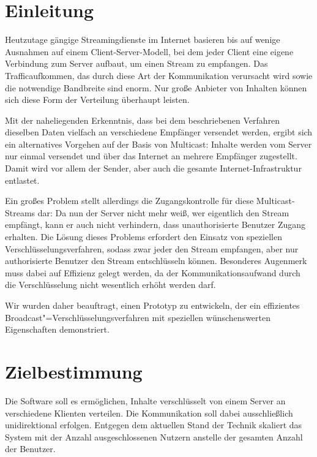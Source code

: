 \documentclass[a4paper,10pt]{article}
\title{\doctitle}
\author{\authorName}
\date{\today}
\begin{document}

\tableofcontents

\clearpage
\section{Einleitung}

Heutzutage gängige Streamingdienste im Internet basieren bis auf wenige Ausnahmen auf
einem Client-Server-Modell, bei dem jeder Client eine eigene Verbindung zum Server
aufbaut, um einen Stream zu empfangen. Das Trafficaufkommen, das durch diese Art der
Kommunikation verursacht wird sowie die notwendige Bandbreite sind enorm. Nur große
Anbieter von Inhalten können sich diese Form der Verteilung überhaupt leisten.

Mit der naheliegenden Erkenntnis, dass bei dem beschriebenen Verfahren dieselben Daten
vielfach an verschiedene Empfänger versendet werden, ergibt sich ein alternatives
Vorgehen auf der Basis von Multicast: Inhalte werden vom Server nur einmal versendet
und über das Internet an mehrere Empfänger zugestellt. Damit wird vor allem der Sender,
aber auch die gesamte Internet-Infrastruktur entlastet.

Ein großes Problem stellt allerdings die Zugangskontrolle für diese Multicast-Streams
dar: Da nun der Server nicht mehr weiß, wer eigentlich den Stream empfängt, kann
er auch nicht verhindern, dass unauthorisierte Benutzer Zugang erhalten. Die Lösung
dieses Problems erfordert den Einsatz von speziellen Verschlüsselungsverfahren,
sodass zwar jeder den Stream empfangen, aber nur authorisierte Benutzer den Stream
entschlüsseln können. Besonderes Augenmerk muss dabei auf Effizienz gelegt werden,
da der Kommunikationsaufwand durch die Verschlüsselung nicht wesentlich erhöht werden
darf.

Wir wurden daher beauftragt, einen Prototyp zu entwickeln, der ein effizientes
Broadcast"=Verschlüsselungsverfahren mit speziellen wünschenswerten Eigenschaften
demonstriert.

\section{Zielbestimmung}
Die Software soll es ermöglichen, Inhalte verschlüsselt von einem Server an verschiedene Klienten verteilen. Die Kommunikation soll dabei ausschließlich unidirektional erfolgen.
Entgegen dem aktuellen Stand der Technik skaliert das System mit der Anzahl ausgeschlossenen Nutzern anstelle der gesamten Anzahl der Benutzer.
\end{document}

